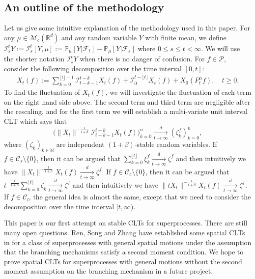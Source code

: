 \documentclass[12pt,a4paper]{amsart}
\theoremstyle{plain}
\theoremstyle{definition}
\numberwithin{equation}{section}
\begin{document}
\subsection{An outline of the methodology}
Let us give some intuitive explanation of the methodology used in this paper.
For any $\mu\in \mathcal M_c(\mathbb R^d)$ and any random variable $Y$ with finite mean, we define
$
  \mathcal I_s^t Y
  := \mathcal I_s^t [Y, \mu]
  := \mathbb P_\mu[Y|\mathscr F_t] - \mathbb P_\mu[Y|\mathscr F_s]
$
  where $0 \leq s \leq t <\infty.$
We will use the shorter notation $\mathcal I_s^t Y$ when there is no danger of confusion.
For $f\in \mathcal{P}$, consider the following decomposition over the time interval $[0,t]$:
\begin{align}
  X_t(f)
  := \sum_{k=0}^{\lfloor t \rfloor-1} \mathcal I_{t-k-1}^{t-k} X_t (f)+\mathcal I_0^{t-\lfloor t \rfloor} X_t(f) + X_0( P^\alpha_tf),
  \quad t\geq 0.
\end{align}
To find the fluctuation of $X_t(f)$, we will investigate the fluctuation of each term on the right hand side above.
The second term and third term are negligible after the rescaling, and for the first term we will establish
a multi-variate unit interval CLT  which says that
\[
  \Big( \|X_t\|^{-\frac{1}{1+\beta}}\mathcal I^{t-k}_{t-k-1} X_t(f) \Big)_{k=0}^n
  \xrightarrow [t\to \infty]{d} (\zeta^f_k)_{k=0}^n,
\]
where $(\zeta_k)_{k \in \mathbb N}$ are independent $(1+\beta)$-stable random variables.
If $f \in \mathcal C_s\setminus\{0\}$, then it can be argued that $\sum_{k=0}^{\lfloor t \rfloor} \xi^f_k \xrightarrow[t\to \infty]{d} \zeta^f$ and then intuitively we have
\(
  \|X_t\|^{-\frac{1}{1+\beta}}  X_t(f)
  \xrightarrow[t\to \infty]{d} \zeta^f.
  \)
If $f \in \mathcal C_c \setminus \{0\}$, then it can be argued that
\(
t^{-\frac{1}{1+\beta}} \sum_{k=0}^{\lfloor t\rfloor} \zeta_k \xrightarrow[t\to \infty]{ d} \zeta^f
\)
and then intuitively we have
\(
\|tX_t\|^{-\frac{1}{1+\beta}}  X_t(f)
\xrightarrow[t\to \infty]{d} \zeta^f.
\)
If $f\in \mathcal C_l$, the general idea is almost the same, except that we need to consider the decomposition over the time interval $[t,\infty)$.


This paper is our first attempt on stable CLTs for superprocesses.
There are still many open questions.
Ren, Song and Zhang have established some spatial  CLTs in \cite{RenSongZhang2015Central} for a class of superprocesses with general spatial motions under
the assumption that the branching mechanisms satisfy a second moment condition.
We hope to prove spatial CLTs for superprocesses with general motions without the second moment assumption on the branching mechanism in a future project.
\end{document}
